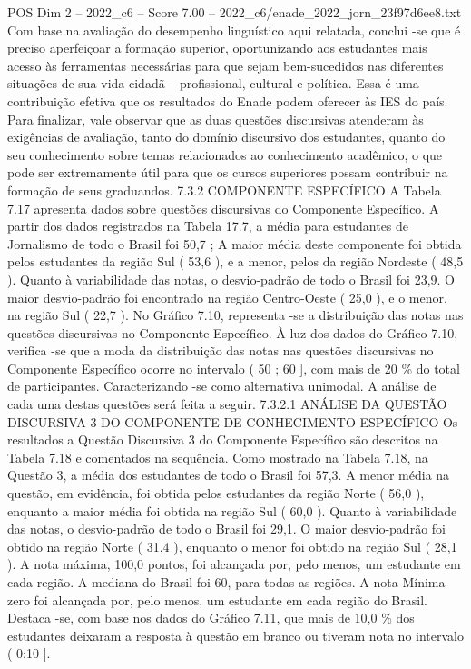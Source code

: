 \begin{textsample}{POS Dim 2 – 2022\_c6 – Score 7.00 – 2022\_c6/enade\_2022\_jorn\_23f97d6ee8.txt}
Com base na avaliação do desempenho linguístico aqui relatada, conclui -se que é preciso aperfeiçoar a formação superior, oportunizando aos estudantes mais acesso às ferramentas necessárias para que sejam bem-sucedidos nas diferentes situações de sua vida cidadã – profissional, cultural e política.
Essa é uma contribuição efetiva que os resultados do Enade podem oferecer às IES do país.
Para finalizar, vale observar que as duas questões discursivas atenderam às exigências de avaliação, tanto do domínio discursivo dos estudantes, quanto do seu conhecimento sobre temas relacionados ao conhecimento acadêmico, o que pode ser extremamente útil para que os cursos superiores possam contribuir na formação de seus graduandos. 7.3.2 COMPONENTE ESPECÍFICO A Tabela 7.17 apresenta dados sobre questões discursivas do Componente Específico.
A partir dos dados registrados na Tabela 17.7, a média para estudantes de Jornalismo de todo o Brasil foi 50,7 ; A maior média deste componente foi obtida pelos estudantes da região Sul ( 53,6 ), e a menor, pelos da região Nordeste ( 48,5 ).
Quanto à variabilidade das notas, o desvio-padrão de todo o Brasil foi 23,9.
O maior desvio-padrão foi encontrado na região Centro-Oeste ( 25,0 ), e o menor, na região Sul ( 22,7 ).
No Gráfico 7.10, representa -se a distribuição das notas nas questões discursivas no Componente Específico.
À luz dos dados do Gráfico 7.10, verifica -se que a moda da distribuição das notas nas questões discursivas no Componente Específico ocorre no intervalo ( 50 ; 60 ], com mais de 20 \% do total de participantes.
Caracterizando -se como alternativa unimodal.
A análise de cada uma destas questões será feita a seguir. 7.3.2.1 ANÁLISE DA QUESTÃO DISCURSIVA 3 DO COMPONENTE DE CONHECIMENTO ESPECÍFICO Os resultados a Questão Discursiva 3 do Componente Específico são descritos na Tabela 7.18 e comentados na sequência.
Como mostrado na Tabela 7.18, na Questão 3, a média dos estudantes de todo o Brasil foi 57,3.
A menor média na questão, em evidência, foi obtida pelos estudantes da região Norte ( 56,0 ), enquanto a maior média foi obtida na região Sul ( 60,0 ).
Quanto à variabilidade das notas, o desvio-padrão de todo o Brasil foi 29,1.
O maior desvio-padrão foi obtido na região Norte ( 31,4 ), enquanto o menor foi obtido na região Sul ( 28,1 ).
A nota máxima, 100,0 pontos, foi alcançada por, pelo menos, um estudante em cada região.
A mediana do Brasil foi 60, para todas as regiões.
A nota Mínima zero foi alcançada por, pelo menos, um estudante em cada região do Brasil.
Destaca -se, com base nos dados do Gráfico 7.11, que mais de 10,0 \% dos estudantes deixaram a resposta à questão em branco ou tiveram nota no intervalo ( 0:10 ].

\end{textsample}
